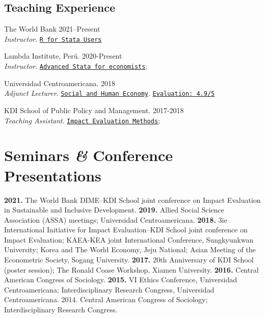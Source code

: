 \documentclass[a4paper, 10pt]{article}
\renewenvironment{itemize}{
  \begin{list}{}
    { \setlength{\itemsep}{5pt}
      \setlength{\parsep}{0pt}
      \setlength{\topsep}{0pt}
      \setlength{\leftmargin}{0em} } }{
  \end{list}}
\begin{document}
\subsection*{Teaching Experience}
\begin{itemize}
  \item The World Bank \hfill 2021--Present \\  {\small \emph{Instructor}.} \texttt{\href{https://github.com/worldbank/dime-r-training}{R for Stata Users}}

  \item Lambda Institute, Perú. \hfill 2020-Present \\ {\small \emph{Instructor}.} \texttt{\href{https://github.com/lambda-stata/course-materials}{Advanced Stata for economists}}; \texttt{\color{DarkSlateBlue}{Advanced Methods in Econometrics: Impact Evaluation}}
 
  \item Universidad Centroamericana. \hfill 2018 \\ {\small \emph{Adjunct Lecturer}.} \texttt{\href{https://github.com/econsoc-uca}{Social and Human Economy}}. \texttt{\href{https://rrmaximiliano.github.io/docs/evaluation-esh.pdf}{Evaluation: 4.9/5}}
  
  \item KDI School of Public Policy and Management. \hfill 2017-2018 \\ {\small \emph{Teaching Assistant}.} \texttt{\href{https://www.dropbox.com/home/teaching_materials/kdischool/spring_2018_impact_evaluation}{Impact Evaluation Methods}}; \texttt{\color{DarkSlateBlue}{Foundations of Sustainable Development}}
\end{itemize}

\section*{Seminars \textit{\&} Conference Presentations}

\begin{itemize}
  \item \textbf{2021.} The World Bank DIME--KDI School joint conference on Impact Evaluation in Sustainable and Inclusive Development. \textbf{2019.} Allied Social Science Association (ASSA) meetings; Universidad Centroamericana. \textbf{2018.} 3ie International Initiative for Impact Evaluation--KDI School joint conference on Impact Evaluation; KAEA-KEA joint International Conference, Sungkyunkwan University; Korea and The World Economy, Jeju National; Asian Meeting of the Econometric Society, Sogang University. \textbf{2017.} 20th Anniversary of KDI School (poster session); The Ronald Coase Workshop, Xiamen University. \textbf{2016.} Central American Congress of Sociology. \textbf{2015.} VI Ethics Conference, Universidad Centroamericana; Interdisciplinary Research Congress, Universidad Centroamericana. 2014. Central American Congress of Sociology; Interdisciplinary Research Congress.
\end{itemize}
\end{document}

